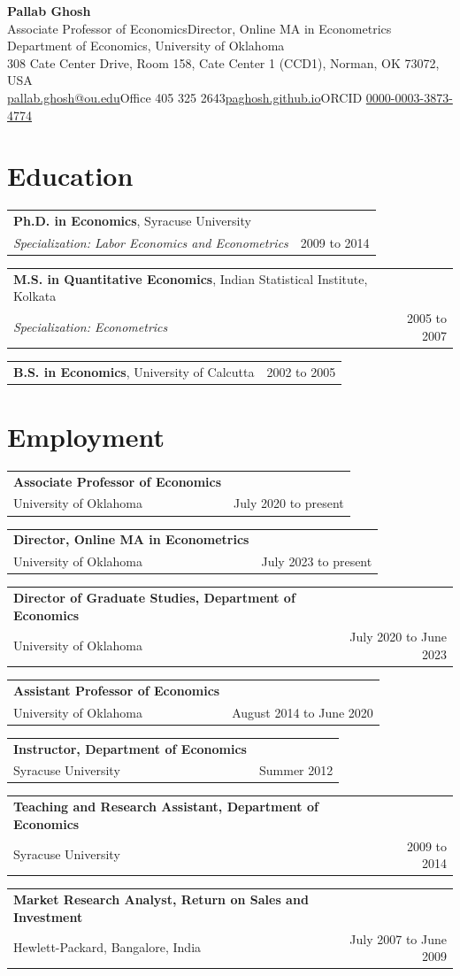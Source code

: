\documentclass[10.5pt]{article}
\makeatletter
\newcommand{\cvrow}[2]{\noindent\begin{tabularx}{\textwidth}{@{}X r@{}} #1 & {\small\color{gray} #2} \end{tabularx}\par}
\makeatother
\begin{document}
\begin{center}{\LARGE\bfseries Pallab Ghosh}\\[0.35em]
{\small Associate Professor of Economics\quad\textbar\quad Director, Online MA in Econometrics}\\[0.15em]
{\small Department of Economics, University of Oklahoma}\\[0.15em]
{\small 308 Cate Center Drive, Room 158, Cate Center 1 (CCD1), Norman, OK 73072, USA}\\[0.15em]
{\small \href{mailto:pallab.ghosh@ou.edu}{pallab.ghosh@ou.edu}\quad\textbar\quad Office 405 325 2643\quad\textbar\quad \href{https://paghosh.github.io}{paghosh.github.io}\quad\textbar\quad ORCID \href{https://orcid.org/0000-0003-3873-4774}{0000-0003-3873-4774}}
\end{center}
\section{Education}
\cvrow{\textbf{Ph.D. in Economics}, Syracuse University\\ {\small\itshape Specialization: Labor Economics and Econometrics}}{2009 to 2014}
\cvrow{\textbf{M.S. in Quantitative Economics}, Indian Statistical Institute, Kolkata\\ {\small\itshape Specialization: Econometrics}}{2005 to 2007}
\cvrow{\textbf{B.S. in Economics}, University of Calcutta}{2002 to 2005}
\section{Employment}
\cvrow{\textbf{Associate Professor of Economics}\\ {\small University of Oklahoma}}{July 2020 to present}
\cvrow{\textbf{Director, Online MA in Econometrics}\\ {\small University of Oklahoma}}{July 2023 to present}
\cvrow{\textbf{Director of Graduate Studies, Department of Economics}\\ {\small University of Oklahoma}}{July 2020 to June 2023}
\cvrow{\textbf{Assistant Professor of Economics}\\ {\small University of Oklahoma}}{August 2014 to June 2020}
\cvrow{\textbf{Instructor, Department of Economics}\\ {\small Syracuse University}}{Summer 2012}
\cvrow{\textbf{Teaching and Research Assistant, Department of Economics}\\ {\small Syracuse University}}{2009 to 2014}
\cvrow{\textbf{Market Research Analyst, Return on Sales and Investment}\\ {\small Hewlett-Packard, Bangalore, India}}{July 2007 to June 2009}
\end{document}
